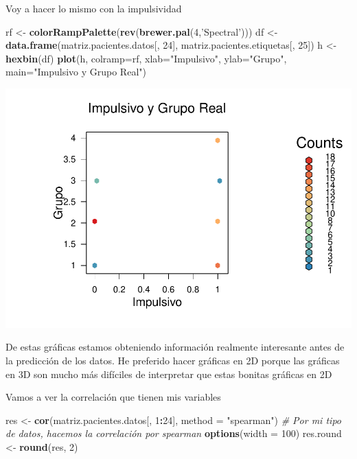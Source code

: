 \documentclass[]{article}
\newenvironment{Shaded}{\begin{snugshade}}{\end{snugshade}}
\newcommand{\KeywordTok}[1]{\textcolor[rgb]{0.13,0.29,0.53}{\textbf{#1}}}
\newcommand{\DataTypeTok}[1]{\textcolor[rgb]{0.13,0.29,0.53}{#1}}
\newcommand{\DecValTok}[1]{\textcolor[rgb]{0.00,0.00,0.81}{#1}}
\newcommand{\StringTok}[1]{\textcolor[rgb]{0.31,0.60,0.02}{#1}}
\newcommand{\CommentTok}[1]{\textcolor[rgb]{0.56,0.35,0.01}{\textit{#1}}}
\newcommand{\OperatorTok}[1]{\textcolor[rgb]{0.81,0.36,0.00}{\textbf{#1}}}
\newcommand{\NormalTok}[1]{#1}
\begin{document}
Voy a hacer lo mismo con la impulsividad

\begin{Shaded}
\begin{Highlighting}[]
\NormalTok{rf <-}\StringTok{ }\KeywordTok{colorRampPalette}\NormalTok{(}\KeywordTok{rev}\NormalTok{(}\KeywordTok{brewer.pal}\NormalTok{(}\DecValTok{4}\NormalTok{,}\StringTok{'Spectral'}\NormalTok{)))}
\NormalTok{df <-}\StringTok{ }\KeywordTok{data.frame}\NormalTok{(matriz.pacientes.datos[, }\DecValTok{24}\NormalTok{], matriz.pacientes.etiquetas[, }\DecValTok{25}\NormalTok{])}
\NormalTok{h <-}\StringTok{ }\KeywordTok{hexbin}\NormalTok{(df)}
\KeywordTok{plot}\NormalTok{(h, }\DataTypeTok{colramp=}\NormalTok{rf, }\DataTypeTok{xlab=}\StringTok{"Impulsivo"}\NormalTok{, }\DataTypeTok{ylab=}\StringTok{"Grupo"}\NormalTok{, }\DataTypeTok{main=}\StringTok{"Impulsivo y Grupo Real"}\NormalTok{)}
\end{Highlighting}
\end{Shaded}

\includegraphics{codigo_files/figure-latex/grafico_impulsivo_grupo-1.pdf}

De estas gráficas estamos obteniendo información realmente interesante
antes de la predicción de los datos. He preferido hacer gráficas en 2D
porque las gráficas en 3D son mucho más difíciles de interpretar que
estas bonitas gráficas en 2D

Vamos a ver la correlación que tienen mis variables

\begin{Shaded}
\begin{Highlighting}[]
\NormalTok{res <-}\StringTok{ }\KeywordTok{cor}\NormalTok{(matriz.pacientes.datos[, }\DecValTok{1}\OperatorTok{:}\DecValTok{24}\NormalTok{], }\DataTypeTok{method =} \StringTok{"spearman"}\NormalTok{) }\CommentTok{# Por mi tipo de datos, hacemos la correlación por spearman}
\KeywordTok{options}\NormalTok{(}\DataTypeTok{width =} \DecValTok{100}\NormalTok{)}
\NormalTok{res.round <-}\StringTok{ }\KeywordTok{round}\NormalTok{(res, }\DecValTok{2}\NormalTok{)}
\end{Highlighting}
\end{Shaded}
\end{document}
